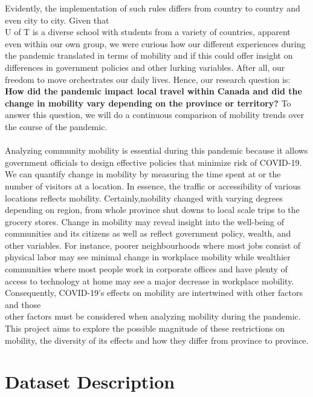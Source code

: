 \documentclass[fontsize=11pt]{article}
\begin{document}
    \indent Evidently, the implementation of such rules differs from country to country and even city to city. Given that \\ U of T is a diverse school with students from a variety of countries, apparent even within our own group, we were curious how our different experiences during the pandemic translated in terms of mobility and if this could offer insight on differences in government policies and other lurking variables. After all, our freedom to move orchestrates our daily lives. Hence, our research question is: \textbf{How did the pandemic impact local travel within Canada and did the change in mobility vary depending on the province or territory?} To answer this question, we will do a continuous comparison of mobility trends over the course of the pandemic. \\\\ \indent Analyzing community mobility is essential during this pandemic because it allows government officials to design effective policies that minimize risk of COVID-19. We can quantify change in mobility by measuring the time spent at or the number of visitors at a location. In essence, the traffic or accessibility of various locations reflects mobility. Certainly,mobility changed with varying degrees depending on region, from whole province shut downs to local scale trips to the grocery stores. Change in mobility may reveal insight into the well-being of communities and its citizens as well as reflect government policy, wealth, and other variables. For instance, poorer neighbourhoods where most jobs consist of physical labor may see minimal change in workplace mobility while wealthier communities where most people work in corporate offices and have plenty of access to technology at home may see a major decrease in workplace mobility. Consequently, COVID-19’s effects on mobility are intertwined with other factors and those \\  other factors must be considered when analyzing mobility during the pandemic. This project aims to explore the possible magnitude of these restrictions on mobility, the diversity of its effects and how they differ from province to province.



    \section*{Dataset Description}
\end{document}
